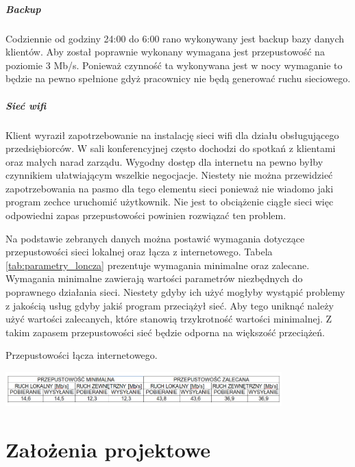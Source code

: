 \documentclass{report}
\begin{document}
\paragraph{Backup}Codziennie od godziny 24:00 do 6:00 rano wykonywany jest backup bazy danych klientów. Aby został poprawnie wykonany wymagana jest przepustowość 
na poziomie 3 Mb/s. Ponieważ czynność ta wykonywana jest w nocy wymaganie to będzie na pewno spełnione gdyż pracownicy nie będą generować ruchu
sieciowego.

\paragraph{Sieć wifi}Klient wyraził zapotrzebowanie na instalację sieci wifi dla działu obsługującego przedsiębiorców. W sali konferencyjnej często dochodzi  
do spotkań z klientami oraz małych narad zarządu. Wygodny dostęp dla internetu na pewno byłby czynnikiem ułatwiającym wszelkie negocjacje.
Niestety nie można przewidzieć zapotrzebowania na pasmo dla tego elementu sieci ponieważ nie wiadomo jaki program zechce uruchomić użytkownik.
Nie jest to obciążenie ciągłe sieci więc odpowiedni zapas przepustowości powinien rozwiązać ten problem.

Na podstawie zebranych danych można postawić wymagania dotyczące przepustowości sieci lokalnej oraz łącza z internetowego. Tabela \ref{tab:parametry_loncza}
prezentuje wymagania minimalne oraz zalecane. Wymagania minimalne zawierają wartości parametrów niezbędnych do poprawnego działania sieci. 
Niestety gdyby ich użyć mogłyby wystąpić problemy z jakością usług gdyby jakiś program przeciążył sieć. Aby tego uniknąć należy użyć wartości
zalecanych, które stanowią trzykrotność wartości minimalnej. Z takim zapasem przepustowości sieć będzie odporna na większość przeciążeń.


\begin{table}[H]
\caption{Przepustowości łącza internetowego. }
\label{tab:parametry_loncza}
 \centering
      \includegraphics[width=0.8\textwidth]{./obrazki/ruch_tabele/loncze.png}
\end{table}


\chapter{Założenia projektowe}
\end{document}

